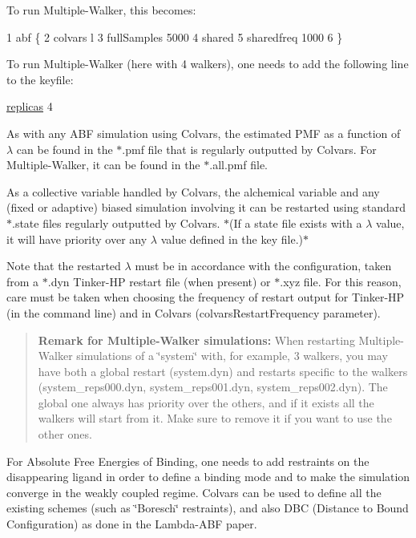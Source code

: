 To run Multiple-\/\-Walker, this becomes\-: 
\begin{DoxyCode}
1 abf \{
2   colvars l
3   fullSamples 5000
4   shared
5   sharedfreq 1000
6 \}
\end{DoxyCode}


To run Multiple-\/\-Walker (here with 4 walkers), one needs to add the following line to the keyfile\-: 
\begin{DoxyCode}
\hyperlink{classreplicas}{replicas} 4
\end{DoxyCode}


As with any A\-B\-F simulation using Colvars, the estimated P\-M\-F as a function of $ \lambda $ can be found in the {\ttfamily $\ast$.pmf} file that is regularly outputted by Colvars. For Multiple-\/\-Walker, it can be found in the {\ttfamily $\ast$.all.\-pmf} file. 



As a collective variable handled by Colvars, the alchemical variable and any (fixed or adaptive) biased simulation involving it can be restarted using standard {\ttfamily $\ast$.state} files regularly outputted by Colvars. $\ast$(If a state file exists with a $ \lambda $ value, it will have priority over any $ \lambda $ value defined in the key file.)$\ast$

Note that the restarted $ \lambda $ must be in accordance with the configuration, taken from a {\ttfamily $\ast$.dyn} Tinker-\/\-H\-P restart file (when present) or {\ttfamily $\ast$.xyz} file. For this reason, care must be taken when choosing the frequency of restart output for Tinker-\/\-H\-P (in the command line) and in Colvars ({\ttfamily colvars\-Restart\-Frequency} parameter).

\begin{quotation}
{\bfseries Remark for Multiple-\/\-Walker simulations\-:} When restarting Multiple-\/\-Walker simulations of a \char`\"{}system\char`\"{} with, for example, 3 walkers, you may have both a global restart ({\ttfamily system.\-dyn}) and restarts specific to the walkers ({\ttfamily system\-\_\-reps000.\-dyn}, {\ttfamily system\-\_\-reps001.\-dyn}, {\ttfamily system\-\_\-reps002.\-dyn}). The global one always has priority over the others, and if it exists all the walkers will start from it. Make sure to remove it if you want to use the other ones.

\end{quotation}




For Absolute Free Energies of Binding, one needs to add restraints on the disappearing ligand in order to define a binding mode and to make the simulation converge in the weakly coupled regime. Colvars can be used to define all the existing schemes (such as \char`\"{}\-Boresch\char`\"{} restraints), and also D\-B\-C (Distance to Bound Configuration) as done in the Lambda-\/\-A\-B\-F paper.

